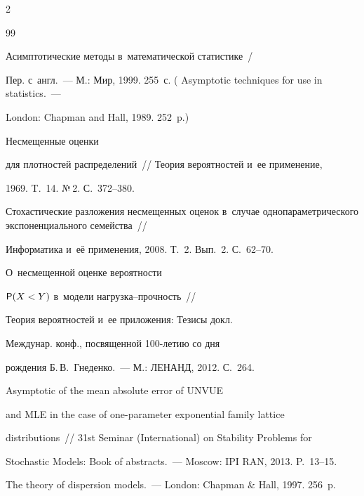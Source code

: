 \begin{multicols}{2}
{{\begin{thebibliography}{99}


 Асимптотические методы в~математической статистике~/


Пер. с~англ.~--- М.: Мир, 1999. 255~с. ( Asymptotic techniques for use in statistics.~---


London: Chapman and Hall, 1989. 252~p.)









 Несмещенные оценки


  для плотностей распределений~// Теория вероятностей и~ее применение,


  1969.  T.~14. №\,2.  С.~372--380.






 Стохастические разложения несмещенных оценок в~случае однопараметрического экспоненциального семейства~//


 Информатика и~её применения, 2008. Т.~2. Вып.~2. С.~62--70.






 О~несмещенной оценке вероятности


  ${\sf P}(X<Y)$ в~модели на\-груз\-ка--проч\-ность~//


  Теория вероятностей  и~ее приложения: Тезисы докл.


  Междунар. конф., посвященной 100-ле\-тию со дня


  рождения Б.\,В.~Гнеденко.~--- М.: ЛЕНАНД, 2012. С.~264.






 Asymptotic of the mean absolute error of UNVUE


 and MLE in the case of one-parameter exponential family lattice


 distributions~// 31st  Seminar (International) on Stability Problems for


 Stochastic Models: Book of abstracts.~--- Moscow: IPI RAN, 2013. P.~13--15.






 The theory of dispersion models.~---  London: Chapman \& Hall, 1997. 256~p.



\end{thebibliography}}}
\end{multicols}
